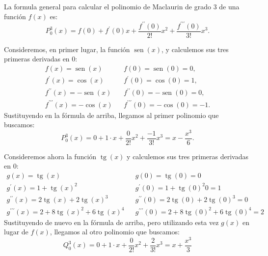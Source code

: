 \documentclass[
  spanish,
  a4paper,
]{scrreport}
\theoremstyle{definition}
\theoremstyle{remark}
\begin{document}
\begin{tcolorbox}[enhanced jigsaw, arc=.35mm, bottomrule=.15mm, bottomtitle=1mm, breakable, colback=white, colbacktitle=quarto-callout-tip-color!10!white, colframe=quarto-callout-tip-color-frame, coltitle=black, left=2mm, leftrule=.75mm, opacityback=0, opacitybacktitle=0.6, rightrule=.15mm, title=\textcolor{quarto-callout-tip-color}{\faLightbulb}\hspace{0.5em}{Solución}, titlerule=0mm, toprule=.15mm, toptitle=1mm]

La formula general para calcular el polinomio de Maclaurin de grado 3 de
una función \(f(x)\) es: \[
P_{0}^{3}(x)=f(0)+f^{\prime }(0)x+\frac{f^{\prime \prime }(0)}{2!}x^{2}+\frac{f^{\prime \prime \prime }(0)}{3!}x^{3}.
\]

Consideremos, en primer lugar, la función \(\operatorname{sen}(x)\), y
calculemos sus tres primeras derivadas en 0: \[
\begin{array}{lll}
f(x)=\operatorname{sen}(x) &  & f(0)=\operatorname{sen}(0)=0, \\
f^{\prime }(x)=\cos(x) &  & f^{\prime }(0)=\cos(0)=1, \\
f^{\prime \prime }(x)=-\operatorname{sen}(x) &  & f^{\prime \prime }(0)=-\operatorname{sen}(0)=0, \\
f^{\prime \prime \prime }(x)=-\cos(x) &  & f^{\prime \prime \prime }(0)=-\cos(0)=-1.
\end{array}
\] Sustituyendo en la fórmula de arriba, llegamos al primer polinomio
que buscamos: \[
P_{0}^{3}(x)=0+1\cdot x+\frac{0}{2!}x^{2}+\frac{-1}{3!}x^{3}=x-\frac{x^{3}}{6}.
\]

Consideremos ahora la función \(\operatorname{tg}(x)\) y calculemos sus
tres primeras derivadas en 0: \[
\begin{array}{lll}
g(x)=\operatorname{tg}(x) &  & g(0)=\operatorname{tg}(0)=0 \\
g^{\prime }(x)=1+\operatorname{tg}(x)^2 &  & g^{\prime }(0)=1+\operatorname{tg}(0)^2 0=1 \\
g^{\prime \prime }(x)= 2\operatorname{tg}(x)+2\operatorname{tg}(x)^3 &  & g^{\prime \prime}(0)= 2\operatorname{tg}(0)+2\operatorname{tg}(0)^3=0 \\
g^{\prime \prime \prime }(x)=2+ 8\operatorname{tg}(x)^2+6\operatorname{tg}(x)^4 &  & g^{\prime \prime \prime }(0)= 2+ 8\operatorname{tg}(0)^2+6\operatorname{tg}(0)^4=2
\end{array}
\] Sustituyendo de nuevo en la fórmula de arriba, pero utilizando esta
vez \(g(x)\) en lugar de \(f(x)\), llegamos al otro polinomio que
buscamos: \[
Q_{0}^{3}(x)=0+1\cdot x+\frac{0}{2!}x^{2}+\frac{2}{3!}x^{3}=x+\frac{x^{3}}{3}
\]


\end{tcolorbox}
\end{document}
